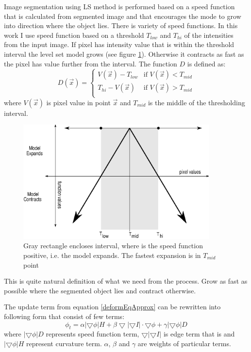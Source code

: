 Image segmentation using LS method is performed based on a speed function that is calculated from segmented image and that encourages the mode to grow into direction where the object lies.
There is variety of speed functions.
In this work I use speed function based on a threshold $T_{low}$ and $T_{hi}$ of the intensities from the input image.
If pixel has intensity value that is within the threshold interval the level set model grows (see figure \ref{fg:speedFunction}).
Otherwise it contracts as fast as the pixel has value further from the interval.
The function $D$ is defined as:
\begin{equation}
\label{eq:speedFunction}
D(\vec{x}) =
\begin{cases}
V(\vec{x}) - T_{low} & \text{if $V(\vec{x}) < T_{mid}$}\\
T_{hi} - V(\vec{x}) & \text{if $V(\vec{x}) > T_{mid}$}\\
\end{cases}
\end{equation}
where $V(\vec{x})$ is pixel value in point $\vec{x}$ and $T_{mid}$ is the middle of the thresholding interval.

\begin{figure}
    \centering
    \includegraphics[width=0.9\textwidth]{data/speedFunction}
    \caption[Graph of thresholding based speed function]
    {
      Gray rectangle encloses interval, where is the speed function positive, i.e. the model expands.
      The fastest expansion is in $T_{mid}$ point
    }
    \label{fg:speedFunction}
\end{figure}

This is quite natural definition of what we need from the process.
Grow as fast as possible where the segmented object lies and contract otherwise.

The update term from equation \ref{deformEqApprox} can be rewritten into following form that consist of few terms:
\begin{equation}
\phi_t = \alpha |\bigtriangledown \phi| H + \beta
\bigtriangledown|\bigtriangledown I|\cdot \bigtriangledown \phi +
\gamma|\bigtriangledown \phi|D
\end{equation}
where $|\bigtriangledown \phi|D$ represents speed function term, $\bigtriangledown|\bigtriangledown I|$ is edge term that is and $|\bigtriangledown \phi| H$ represent curvature term. $\alpha$, $\beta$ and $\gamma$ are weights of particular terms.

